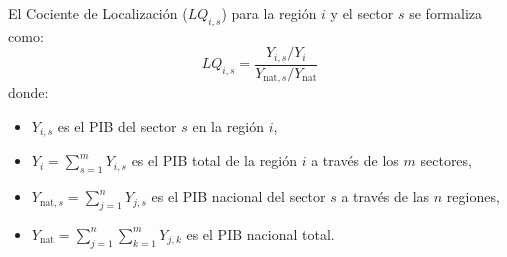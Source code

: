 \documentclass[11pt,a4paper]{article}
\begin{document}
El Cociente de Localización ($LQ_{i,s}$) para la región $i$ y el sector $s$ se formaliza como:
\begin{equation}
LQ_{i,s} = \frac{Y_{i,s} / Y_i}{Y_{\text{nat},s} / Y_{\text{nat}}}
\end{equation}
donde:
\begin{itemize}
    \item $Y_{i,s}$ es el PIB del sector $s$ en la región $i$,
    \item $Y_i = \sum_{s=1}^m Y_{i,s}$ es el PIB total de la región $i$ a través de los $m$ sectores,
    \item $Y_{\text{nat},s} = \sum_{j=1}^n Y_{j,s}$ es el PIB nacional del sector $s$ a través de las $n$ regiones,
    \item $Y_{\text{nat}} = \sum_{j=1}^n \sum_{k=1}^m Y_{j,k}$ es el PIB nacional total.
\end{itemize}
\end{document}

